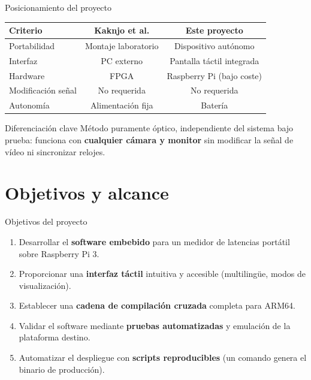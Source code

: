 \documentclass[aspectratio=169,11pt]{beamer}
\begin{document}
\begin{frame}{Posicionamiento del proyecto}

\begin{center}
\begin{tabular}{lcc}
\toprule
\textbf{Criterio} & \textbf{Kaknjo et al.} & \textbf{Este proyecto} \\
\midrule
Portabilidad & Montaje laboratorio & Dispositivo autónomo \\
Interfaz & PC externo & Pantalla táctil integrada \\
Hardware & FPGA & Raspberry Pi (bajo coste) \\
Modificación señal & No requerida & No requerida \\
Autonomía & Alimentación fija & Batería \\
\bottomrule
\end{tabular}
\end{center}

\vspace{0.5cm}

\begin{block}{Diferenciación clave}
Método puramente óptico, independiente del sistema bajo prueba: funciona con \textbf{cualquier cámara y monitor} sin modificar la señal de vídeo ni sincronizar relojes.
\end{block}

\end{frame}

\section{Objetivos y alcance}

\begin{frame}{Objetivos del proyecto}

\begin{enumerate}
    \item Desarrollar el \textbf{software embebido} para un medidor de latencias portátil sobre Raspberry Pi 3.
    \item Proporcionar una \textbf{interfaz táctil} intuitiva y accesible (multilingüe, modos de visualización).
    \item Establecer una \textbf{cadena de compilación cruzada} completa para ARM64.
    \item Validar el software mediante \textbf{pruebas automatizadas} y emulación de la plataforma destino.
    \item Automatizar el despliegue con \textbf{scripts reproducibles} (un comando genera el binario de producción).
\end{enumerate}

\end{frame}
\end{document}
